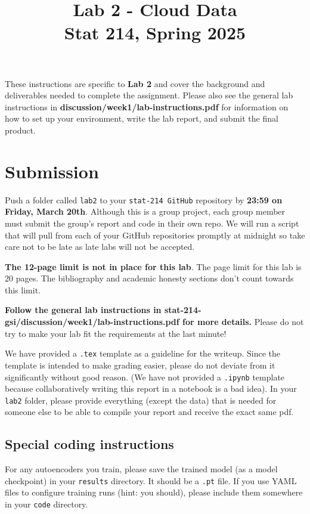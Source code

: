 \documentclass[letterpaper,12pt]{article}
\title{Lab 2 - Cloud Data\\Stat 214, Spring 2025\vspace{-2em}}
\date{}
\begin{document}
\maketitle

These instructions are specific to \textbf{Lab 2} and cover the background and deliverables needed to complete the assignment. Please also see the general lab instructions in \textbf{discussion/week1/lab-instructions.pdf} for information on how to set up your environment, write the lab report, and submit the final product.

\tableofcontents

\section{Submission}
Push a folder called \texttt{lab2} to your \texttt{stat-214 GitHub} repository by \textbf{23:59 on Friday, March 20th}. Although this is a group project, each group member must submit the group's report and code in their own repo. We will run a script that will pull from each of your GitHub repositories promptly at midnight so take care not to be late as late labs will not be accepted.

\textbf{The 12-page limit is not in place for this lab}. The page limit for this lab is 20 pages. The bibliography and academic honesty sections don't count towards this limit.

\textbf{Follow the general lab instructions in stat-214-gsi/discussion/week1/lab-instructions.pdf for more details.} Please do not try to make your lab fit the requirements at the last minute!

We have provided a \texttt{.tex} template as a guideline for the writeup. Since the template is intended to make grading easier, please do not deviate from it significantly without good reason. (We have not provided a \texttt{.ipynb} template because collaboratively writing this report in a notebook is a bad idea). In your \texttt{lab2} folder, please provide everything (except the data) that is needed for someone else to be able to compile your report and receive the exact same pdf.

\subsection{Special coding instructions}
For any autoencoders you train, please save the trained model (as a model checkpoint) in your \texttt{results} directory. It should be a \texttt{.pt} file. If you use YAML files to configure training runs (hint: you should), please include them somewhere in your \texttt{code} directory.
\end{document}
